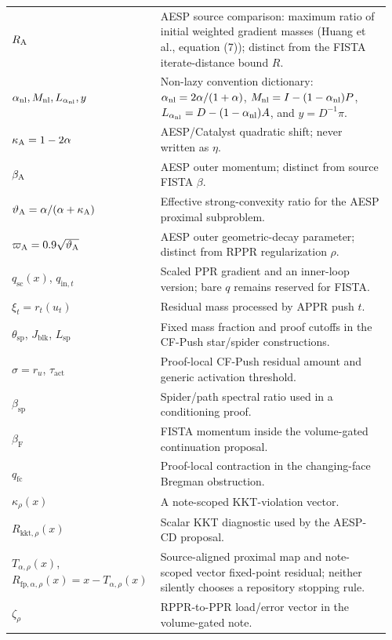 \begin{longtable}{@{}>{\raggedright\arraybackslash}p{0.36\linewidth}>{\raggedright\arraybackslash}p{0.60\linewidth}@{}}
$R_{\rm A}$ & AESP source comparison: maximum ratio of initial weighted gradient masses (Huang et al., equation (7)); distinct from the FISTA iterate-distance bound $R$. \\
$\alpha_{\rm nl},M_{\rm nl},L_{\alpha_{\rm nl}},y$ & Non-lazy convention dictionary: $\alpha_{\rm nl}=2\alpha/(1+\alpha)$, $M_{\rm nl}=I-(1-\alpha_{\rm nl})P$, $L_{\alpha_{\rm nl}}=D-(1-\alpha_{\rm nl})A$, and $y=D^{-1}\pi$. \\
$\kappa_{\rm A}=1-2\alpha$ & AESP/Catalyst quadratic shift; never written as $\eta$. \\
$\beta_{\rm A}$ & AESP outer momentum; distinct from source FISTA $\beta$. \\
$\vartheta_{\rm A}=\alpha/(\alpha+\kappa_{\rm A})$ & Effective strong-convexity ratio for the AESP proximal subproblem. \\
$\varpi_{\rm A}=0.9\sqrt{\vartheta_{\rm A}}$ & AESP outer geometric-decay parameter; distinct from RPPR regularization $\rho$. \\
$q_{\mathrm{sc}}(x)$, $q_{\mathrm{in},t}$ & Scaled PPR gradient and an inner-loop version; bare $q$ remains reserved for FISTA. \\
$\xi_t=r_t(u_t)$ & Residual mass processed by APPR push $t$. \\
$\theta_{\mathrm{sp}}$, $J_{\mathrm{blk}}$, $L_{\mathrm{sp}}$ & Fixed mass fraction and proof cutoffs in the CF-Push star/spider constructions. \\
$\sigma=r_u$, $\tau_{\mathrm{act}}$ & Proof-local CF-Push residual amount and generic activation threshold. \\
$\beta_{\mathrm{sp}}$ & Spider/path spectral ratio used in a conditioning proof. \\
$\beta_{\mathrm F}$ & FISTA momentum inside the volume-gated continuation proposal. \\
$q_{\mathrm{fc}}$ & Proof-local contraction in the changing-face Bregman obstruction. \\
$\kappa_\rho(x)$ & A note-scoped KKT-violation vector. \\
$R_{\mathrm{kkt},\rho}(x)$ & Scalar KKT diagnostic used by the AESP-CD proposal. \\
$T_{\alpha,\rho}(x)$, $R_{\mathrm{fp},\alpha,\rho}(x)=x-T_{\alpha,\rho}(x)$ & Source-aligned proximal map and note-scoped vector fixed-point residual; neither silently chooses a repository stopping rule. \\
$\zeta_\rho$ & RPPR-to-PPR load/error vector in the volume-gated note. \\

\end{longtable}
